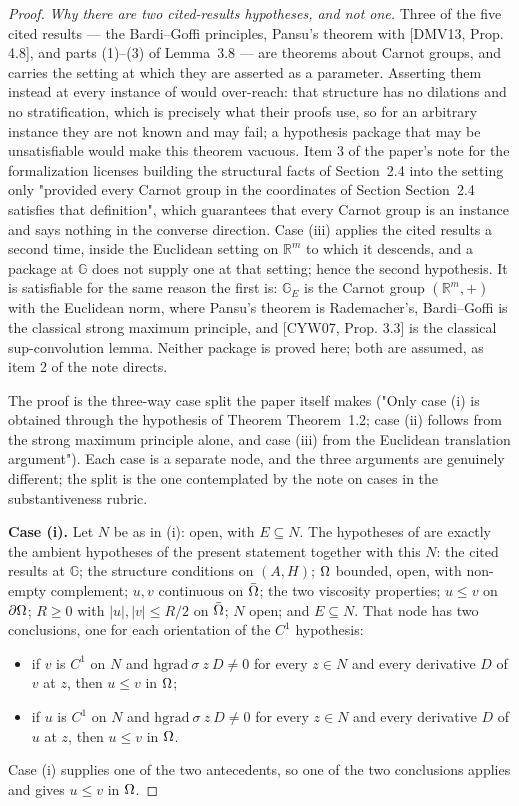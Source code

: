 \begin{proof}
\emph{Why there are two cited-results hypotheses, and not one.} Three of the five cited
results --- the Bardi--Goffi principles, Pansu's theorem with [DMV13, Prop. 4.8], and parts
(1)--(3) of Lemma~3.8 --- are theorems about Carnot groups, and  carries
the setting at which they are asserted as a parameter. Asserting them instead at every
instance of  would over-reach: that structure has no dilations and no
stratification, which is precisely what their proofs use, so for an arbitrary instance they
are not known and may fail; a hypothesis package that may be unsatisfiable would make this
theorem vacuous. Item 3 of the paper's note for the formalization licenses building the
structural facts of Section~2.4 into the setting only "provided every Carnot group in the
coordinates of Section Section~2.4 satisfies that definition", which guarantees that every
Carnot group is an instance and says nothing in the converse direction. Case (iii) applies
the cited results a second time, inside the Euclidean setting on $\mathbb R^{m}$ to which it
descends, and a package at $\mathbb G$ does not supply one at that setting; hence the second
hypothesis. It is satisfiable for the same reason the first is: $\mathbb G_E$ is the Carnot
group $(\mathbb R^{m},+)$ with the Euclidean norm, where Pansu's theorem is Rademacher's,
Bardi--Goffi is the classical strong maximum principle, and [CYW07, Prop. 3.3] is the
classical sup-convolution lemma. Neither package is proved here; both are assumed, as item 2
of the note directs.

\medskip
The proof is the three-way case split the paper itself makes ("Only case (i) is obtained
through the hypothesis of Theorem Theorem~1.2; case (ii) follows from the strong maximum
principle alone, and case (iii) from the Euclidean translation argument"). Each case is a
separate node, and the three arguments are genuinely different; the split is the one
contemplated by the note on cases in the substantiveness rubric.

\medskip\noindent\textbf{Case (i).} Let $N$ be as in (i): open, with $E\subseteq N$. The
hypotheses of  are exactly the ambient hypotheses of the present
statement together with this $N$: the cited results at $\mathbb G$; the structure conditions
on $(A,H)$;
$\Omega$ bounded, open, with non-empty complement; $u,v$ continuous on $\bar{\Omega}$; the two
viscosity properties; $u\le v$ on $\partial\Omega$; $R\ge0$ with $|u|,|v|\le R/2$ on $\bar{\Omega}$; $N$
open; and $E\subseteq N$. That node has two conclusions, one for each orientation of the
$C^{1}$ hypothesis:
\begin{itemize}
\item if $v$ is $C^{1}$ on $N$ and $\mathrm{hgrad}\ \sigma\ z\ D\ne0$ for every $z\in N$ and
  every derivative $D$ of $v$ at $z$, then $u\le v$ in $\Omega$;
\item if $u$ is $C^{1}$ on $N$ and $\mathrm{hgrad}\ \sigma\ z\ D\ne0$ for every $z\in N$ and
  every derivative $D$ of $u$ at $z$, then $u\le v$ in $\Omega$.
\end{itemize}
Case (i) supplies one of the two antecedents, so one of the two conclusions applies and gives
$u\le v$ in $\Omega$.


\end{proof}
